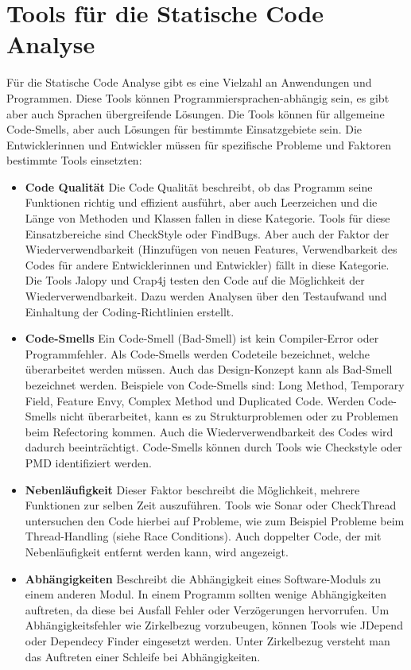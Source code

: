 \section{Tools für die Statische Code Analyse}
Für die Statische Code Analyse gibt es eine Vielzahl an Anwendungen und Programmen. Diese Tools können Programmiersprachen-abhängig sein, es gibt aber auch Sprachen übergreifende Lösungen. Die Tools können für allgemeine Code-Smells, aber auch Lösungen für bestimmte Einsatzgebiete sein. Die Entwicklerinnen und Entwickler müssen für spezifische Probleme und Faktoren bestimmte Tools einsetzten:

\begin{itemize}
\item \textbf{Code Qualität} Die Code Qualität beschreibt, ob das Programm seine Funktionen richtig und effizient ausführt, aber auch Leerzeichen und die Länge von Methoden und Klassen fallen in diese Kategorie. Tools für diese Einsatzbereiche sind CheckStyle oder FindBugs. Aber auch der Faktor der Wiederverwendbarkeit (Hinzufügen von neuen Features, Verwendbarkeit des Codes für andere Entwicklerinnen und Entwickler) fällt in diese Kategorie. Die Tools Jalopy und Crap4j testen den Code auf die Möglichkeit der Wiederverwendbarkeit. Dazu werden Analysen über den Testaufwand und Einhaltung der Coding-Richtlinien erstellt.
\item  \textbf{Code-Smells}
Ein Code-Smell (Bad-Smell) ist kein Compiler-Error oder Programmfehler. Als Code-Smells werden Codeteile bezeichnet, welche überarbeitet werden müssen. Auch das Design-Konzept kann als Bad-Smell bezeichnet werden. Beispiele von Code-Smells sind: Long Method, Temporary Field, Feature Envy, Complex Method und Duplicated Code. Werden Code-Smells nicht überarbeitet, kann es zu Strukturproblemen oder zu Problemen beim Refectoring kommen. Auch die Wiederverwendbarkeit des Codes wird dadurch beeinträchtigt. Code-Smells können durch Tools wie Checkstyle oder PMD identifiziert werden. ~\parencite{palomba2014they}
\item \textbf{Nebenläufigkeit}
Dieser Faktor beschreibt die Möglichkeit, mehrere Funktionen zur selben Zeit auszuführen. Tools wie Sonar oder CheckThread untersuchen den Code hierbei auf Probleme, wie zum Beispiel Probleme beim Thread-Handling (siehe Race Conditions). Auch doppelter Code, der mit Nebenläufigkeit entfernt werden kann, wird angezeigt.
\item \textbf{Abhängigkeiten}
Beschreibt die Abhängigkeit eines Software-Moduls zu einem anderen Modul. In einem Programm sollten wenige Abhängigkeiten auftreten, da diese bei Ausfall Fehler oder Verzögerungen hervorrufen. Um Abhängigkeitsfehler wie Zirkelbezug vorzubeugen, können Tools wie JDepend oder Dependecy Finder eingesetzt werden. Unter Zirkelbezug versteht man das Auftreten einer Schleife bei Abhängigkeiten.

\end{itemize}
